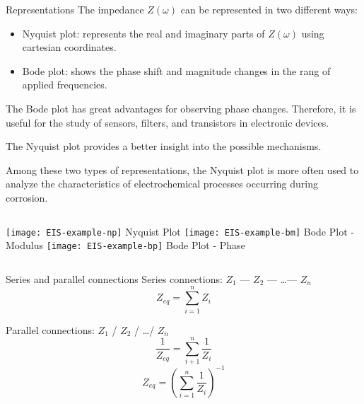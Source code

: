 \documentclass[10pt,compress,handout]{beamer}
\begin{document}
    \begin{frame}[allowframebreaks=1.0]{Representations}
        The impedance $Z(\omega)$ can be represented in two different ways:
        \begin{itemize}
            \item  Nyquist plot: represents the real and imaginary parts of $Z(\omega)$ using cartesian coordinates.
            \item  Bode plot: shows the phase shift and magnitude changes in the rang of applied frequencies.
        \end{itemize}
    
        The Bode plot has great advantages for observing phase changes. 
        Therefore, it is useful for the study of sensors, filters, and transistors in electronic devices.
        
        The Nyquist plot provides a better insight into the possible mechanisms.

        \framebreak
        Among these two types of representations, the Nyquist plot is more often used to analyze the characteristics of
        electrochemical processes occurring during corrosion.
        \begin{columns}
            \centering
                \centering
                \texttt{[image: EIS-example-np]}
                Nyquist Plot
                \centering
                \texttt{[image: EIS-example-bm]}
                Bode Plot - Modulus
                \centering
                \texttt{[image: EIS-example-bp]}
                Bode Plot - Phase
        \end{columns}
    \end{frame}

    \begin{frame}{Series and parallel connections}
        Series connections: $Z_1$ --- $Z_2$ --- \ldots --- $Z_n$
        $$ Z_{eq} = \sum _{i=1}^n Z_i $$

        Parallel connections: $Z_1$ / $Z_2$ / \ldots / $Z_n$ 
        $$ \frac{1}{Z_{eq}} = \sum _{i+1}^n \frac{1}{Z_i} $$
        $$ Z_{eq} = \left( \sum _{i=1}^n \frac{1}{Z_i} \right)^{-1} $$
    \end{frame}
\end{document}
